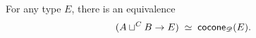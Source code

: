 \documentclass[hott-all.tex]{subfiles}
\begin{document}
% 
\begin{lem}
  For any type $E$, there is an equivalence
  \[ (A\sqcup^C B \to E) \;\simeq\; \mathsf{cocone}_{\mathscr{D}}(E). \]
\end{lem}
% 
%
\end{document}
